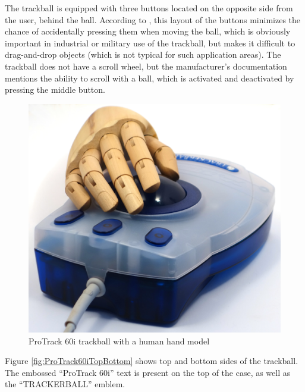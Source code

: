 \documentclass[11pt, a4paper]{article}
\begin{document}
The trackball is equipped with three buttons located on the opposite side from the user, behind the ball.
According to \cite{trackballfan}, this layout of the buttons minimizes the chance of accidentally pressing them when moving the ball, which is obviously important in industrial or military use of the trackball, but makes it difficult to drag-and-drop objects (which is not typical for such application areas).
The trackball does not have a scroll wheel, but the manufacturer's documentation mentions the ability to scroll with a ball, which is activated and deactivated by pressing the middle button.

\begin{figure}[h]
    \centering
    \includegraphics[scale=0.3]{1999_protrack_60i/raz_monstr_60.jpg}
    \caption{ProTrack 60i trackball with a human hand model}
    \label{fig:ProTrack60iHand}
\end{figure}

Figure \ref{fig:ProTrack60iTopBottom} shows top and bottom sides of the trackball.
The embossed “ProTrack 60i” text is present on the top of the case, as well as the “TRACKERBALL” emblem.
\end{document}
